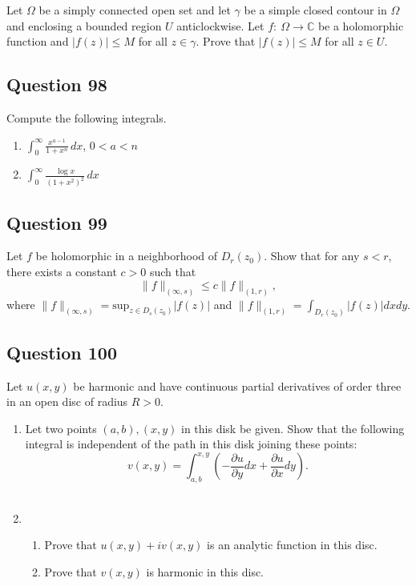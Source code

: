 \documentclass[12pt]{article}
\begin{document}
Let \(\Omega\) be a simply connected open set and let \(\gamma\) be a
simple closed contour in \(\Omega\) and enclosing a bounded region \(U\)
anticlockwise. Let \(f: \ \Omega \to {\mathbb C}\) be a holomorphic
function and \(|f(z)|\leq M\) for all \(z\in \gamma\). Prove that
\(|f(z)|\leq M\) for all \(z\in U\).

\hypertarget{question-98-1}{%
\subsection{Question 98}\label{question-98-1}}

Compute the following integrals.

\begin{enumerate}
\def\labelenumi{(\roman{enumi})}
\item
  \(\displaystyle \int_0^\infty \frac{x^{a-1}}{1 + x^n} \, dx\),
  \(0< a < n\)
\item
  \(\displaystyle \int_0^\infty \frac{\log x}{(1 + x^2)^2}\, dx\)
\end{enumerate}

\hypertarget{question-99-1}{%
\subsection{Question 99}\label{question-99-1}}

Let \(f\) be holomorphic in a neighborhood of \(D_r(z_0)\). Show that
for any \(s<r\), there exists a constant \(c>0\) such that
\[\|f\|_{(\infty, s)} \leq c \|f\|_{(1, r)},\] where
\(\displaystyle \|f\|_{(\infty, s)} = \text{sup}_{z \in D_s(z_0)}|f(z)|\)
and \(\displaystyle \|f\|_{(1, r)} = \int_{D_r(z_0)} |f(z)|dx dy\).

\hypertarget{question-100-1}{%
\subsection{Question 100}\label{question-100-1}}

Let \(u(x,y)\) be harmonic and have continuous partial derivatives of
order three in an open disc of radius \(R>0\).

\begin{enumerate}
\def\labelenumi{(\alph{enumi})}
\item
  Let two points \((a,b), (x,y)\) in this disk be given. Show that the
  following integral is independent of the path in this disk joining
  these points:
  \[v(x,y) = \int_{a,b}^{x,y} ( -\frac{\partial u}{\partial y}dx +  \frac{\partial u}{\partial x}dy).\]\\
\item
  \hfill

  \begin{enumerate}
  \def\labelenumii{(\roman{enumii})}
  \item
    Prove that \(u(x,y)+i v(x,y)\) is an analytic function in this disc.
  \item
    Prove that \(v(x,y)\) is harmonic in this disc.
  \end{enumerate}
\end{enumerate}
\end{document}
